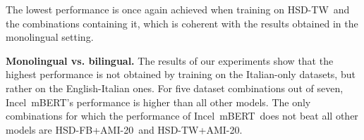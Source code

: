 \documentclass[11pt]{article}
\newcommand{\dsITclassification}{IFS-IT}
\newcommand{\mbert}{\mbox{mBERT$_{base}$}}
\newcommand{\imbert}{\mbox{Incel mBERT}}
\newcommand{\hsdfb}{\mbox{HSD-FB}}
\newcommand{\hsdtw}{\mbox{HSD-TW}}
\newcommand{\ami}{\mbox{AMI-20}}
\begin{document}
The lowest performance is once again achieved when training on \hsdtw\, and the combinations containing it, which is coherent with the results obtained in the monolingual setting.


\vspace*{1mm}
\noindent\textbf{Monolingual vs. bilingual.}
The results of our experiments show that the highest performance is not obtained by training on the Italian-only datasets, but rather on the English-Italian ones. For five dataset combinations out of seven, \imbert's performance is higher than all other models.
The only combinations for which the performance of \imbert\, does not beat all other models are \hsdfb+\ami\, and \hsdtw+\ami.
\end{document}
